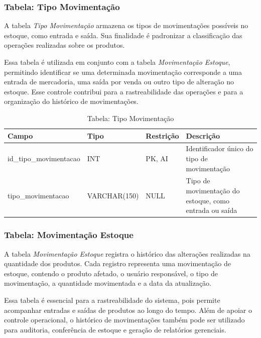\subsubsection{Tabela: Tipo Movimentação}

A tabela \textit{Tipo Movimentação} armazena os tipos de movimentações possíveis no estoque, como entrada e saída. Sua finalidade é padronizar a classificação das operações realizadas sobre os produtos.

Essa tabela é utilizada em conjunto com a tabela \textit{Movimentação Estoque}, permitindo identificar se uma determinada movimentação corresponde a uma entrada de mercadoria, uma saída por venda ou outro tipo de alteração no estoque. Esse controle contribui para a rastreabilidade das operações e para a organização do histórico de movimentações.

\begin{table}[H]
\centering
\begin{tabular}{|p{3cm}|p{3cm}|p{3cm}|p{5cm}|}
\hline
\textbf{Campo} & \textbf{Tipo} & \textbf{Restrição} & \textbf{Descrição} \\ \hline
id\_tipo\_movimentacao & INT & PK, AI & Identificador único do tipo de movimentação \\ \hline
tipo\_movimentacao & VARCHAR(150) & NULL & Tipo de movimentação do estoque, como entrada ou saída \\ \hline
\end{tabular}
\caption{Tabela: Tipo Movimentação}
\end{table}

\subsubsection{Tabela: Movimentação Estoque}

A tabela \textit{Movimentação Estoque} registra o histórico das alterações realizadas na quantidade dos produtos. Cada registro representa uma movimentação de estoque, contendo o produto afetado, o usuário responsável, o tipo de movimentação, a quantidade movimentada e a data da atualização.

Essa tabela é essencial para a rastreabilidade do sistema, pois permite acompanhar entradas e saídas de produtos ao longo do tempo. Além de apoiar o controle operacional, o histórico de movimentações também pode ser utilizado para auditoria, conferência de estoque e geração de relatórios gerenciais.

